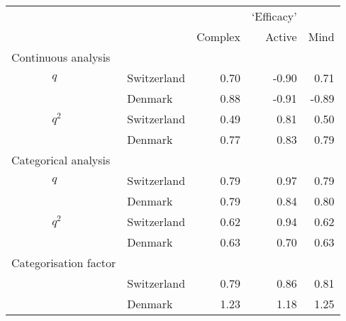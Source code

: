 \documentclass[a4paper,12pt]{article}
\begin{document}
\begin{table}\centering\caption{\label{tab:efficacy}}\begin{tabular}{lllrrr}
\hline
 &  &  &  & `Efficacy' & \\
	   &  &  & Complex & Active & Mind\\
	   \hline
 \multicolumn{2}{l}{Continuous analysis}\\
	 & $q$ & Switzerland & 0.70 & -0.90 & 0.71\\
 &  & Denmark & 0.88 & -0.91 & -0.89\\
 & $q^2$ & Switzerland & 0.49 & 0.81 & 0.50\\
 &  & Denmark & 0.77 & 0.83 & 0.79\\
\multicolumn{2}{l}{Categorical analysis}   &  &  &  & \\
 & $q$ & Switzerland & 0.79 & 0.97 & 0.79\\
 &  & Denmark & 0.79 & 0.84 & 0.80\\
 & $q^2$ & Switzerland & 0.62 & 0.94 & 0.62\\
 &  & Denmark & 0.63 & 0.70 & 0.63\\
\multicolumn{2}{l}{Categorisation factor}    &  &  & \\
 &  & Switzerland & 0.79 & 0.86 & 0.81\\
 &  & Denmark & 1.23 & 1.18 & 1.25\\

\hline
\end{tabular}\end{table}
\end{document}
